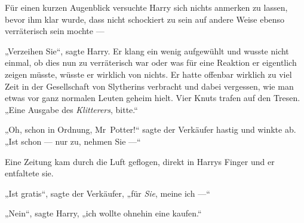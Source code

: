 
Für einen kurzen Augenblick versuchte Harry sich nichts anmerken zu lassen, bevor ihm klar wurde, dass nicht schockiert zu sein auf andere Weise ebenso verräterisch sein mochte —

„Verzeihen Sie“, sagte Harry. Er klang ein wenig aufgewühlt und wusste nicht einmal, ob dies nun zu verräterisch war oder was für eine Reaktion er eigentlich zeigen müsste, wüsste er wirklich von nichts. Er hatte offenbar wirklich zu viel Zeit in der Gesellschaft von Slytherins verbracht und dabei vergessen, wie man etwas vor ganz normalen Leuten geheim hielt. Vier Knuts trafen auf den Tresen.
„Eine Ausgabe des \emph{Klitterers}, bitte.“

„Oh, schon in Ordnung, Mr~Potter!“ sagte der Verkäufer hastig und winkte ab.
„Ist schon — nur zu, nehmen Sie —“

Eine Zeitung kam durch die Luft geflogen, direkt in Harrys Finger und er entfaltete sie.


„Ist gratis“, sagte der Verkäufer, „für \emph{Sie}, meine ich —“

„Nein“, sagte Harry, „ich wollte ohnehin eine kaufen.“

